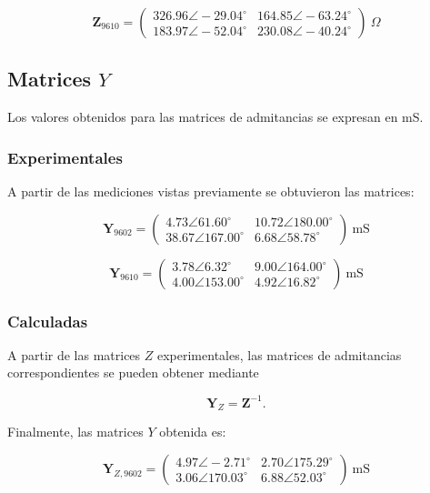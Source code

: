 \[
\mathbf{Z}_{9610} =
    \begin{pmatrix}
    326.96 \angle -29.04^\circ & 164.85 \angle -63.24^\circ \\
    183.97 \angle -52.04^\circ & 230.08 \angle -40.24^\circ
    \end{pmatrix}
    \ \Omega
  \label{mat_Z_9610}  
  \]
    

\subsection{Matrices $Y$}

Los valores obtenidos para las matrices de admitancias se expresan en mS.

\subsubsection{Experimentales}

A partir de las mediciones vistas previamente se obtuvieron las matrices:

\[
\mathbf{Y}_{9602} =
\begin{pmatrix}
4.73 \angle 61.60^\circ & 10.72 \angle 180.00^\circ \\
38.67 \angle 167.00^\circ & 6.68 \angle 58.78^\circ
\end{pmatrix}
\ \mathrm{mS}
\]

\[
\mathbf{Y}_{9610} =
\begin{pmatrix}
3.78 \angle 6.32^\circ & 9.00 \angle 164.00^\circ \\
4.00 \angle 153.00^\circ & 4.92 \angle 16.82^\circ
\end{pmatrix}
\ \mathrm{mS}
\]

\subsubsection{Calculadas}

A partir de las matrices $Z$ experimentales, las matrices de admitancias correspondientes se pueden obtener mediante

\begin{equation}
\mathbf{Y}_{Z}=\mathbf{Z}^{-1}.
\end{equation}

Finalmente, las matrices $Y$ obtenida es:

\[
\mathbf{Y}_{Z,9602} =
\begin{pmatrix}
4.97 \angle -2.71^\circ & 2.70 \angle 175.29^\circ \\
3.06 \angle 170.03^\circ & 6.88 \angle 52.03^\circ
\end{pmatrix}
\ \mathrm{mS}
\label{mat:Y_9602}
\]

